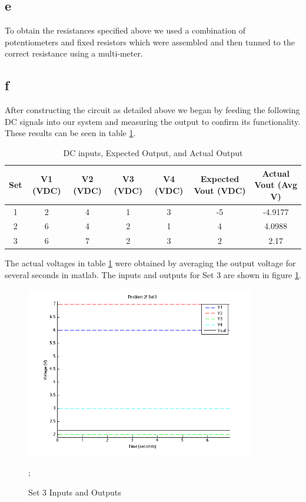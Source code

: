 \documentclass{article}
\theoremstyle{plain}
\theoremstyle{definition}
\theoremstyle{remark}
\begin{document}
\subsection*{e} 
To obtain the resistances specified above we used a combination of potentiometers and fixed resistors which were assembled and then tunned to the correct resistance using a multi-meter. 

\subsection*{f} 
After constructing the circuit as detailed above we began by feeding the following DC signals into our system and measuring the output to confirm its functionality.  These results can be seen in table \ref{q2_ft1}.

\begin{table}[hbt]
\begin{center}
    \begin{tabular}{|c|c|c|c|c|c|c|}
        \hline
        Set & V1 (VDC) & V2 (VDC) & V3 (VDC) & V4 (VDC) & Expected Vout (VDC) & Actual Vout (Avg V) \\ \hline
        1 & 2        & 4        & 1        & 3        & -5                  & -4.9177             \\ 
        2 & 6        & 4        & 2        & 1        & 4                   & 4.0988              \\ 
        3 & 6        & 7        & 2        & 3        & 2                   & 2.17                \\
        \hline
    \end{tabular}
\end{center}
\caption{DC inputs, Expected Output, and Actual Output}
\label{q2_ft1}
\end{table}

The actual voltages in table \ref{q2_ft1} were obtained by averaging the output voltage for several seconds in matlab.
The inputs and outputs for Set 3 are shown in figure \ref{q2_f1}.

\begin{figure}[h]
\begin{center}
\includegraphics[width=10cm]{problem2f_set3.png}
\end{center}
\caption{Set 3 Inputs and Outputs};
\label{q2_f1}
\end{figure}
\end{document}
